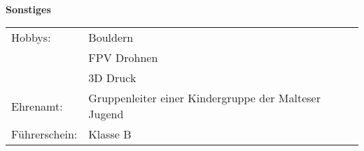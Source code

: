 \documentclass[12pt,twoside,a4paper]{scrlttr2}
\begin{document}
\begin{letter}
\begin{onehalfspace}
\begin{tabular}{  p{4.5cm} l  }
			\end{tabular}		
		
		\textbf{ \\Sonstiges \\ }
		
		\begin{tabular}{  p{4.5cm} l  }
			Hobbys:     	 & Bouldern \\  
							 & FPV Drohnen \\  
						     & 3D Druck \\  
			Ehrenamt: 		 & Gruppenleiter einer Kindergruppe der Malteser Jugend  \\  
			Führerschein: 	 & Klasse B\\
		
		\end{tabular}	
			
		
		\end{onehalfspace}
		
		
	\end{letter}
	
\end{document}
